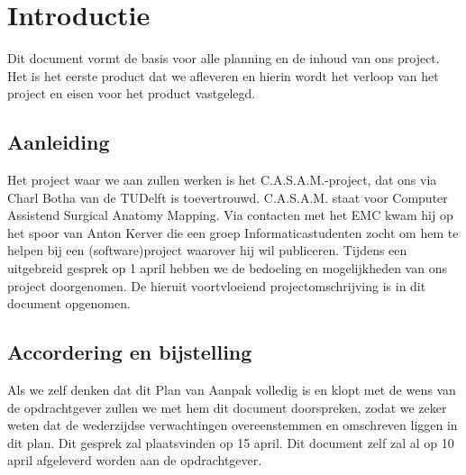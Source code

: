 \section{Introductie}

Dit document vormt de basis voor alle planning en de inhoud van ons project.
Het is het eerste product dat we afleveren en hierin wordt het verloop van het project en eisen voor het product vastgelegd.

\subsection{Aanleiding}

Het project waar we aan zullen werken is het C.A.S.A.M.-project, dat ons via Charl Botha van de TUDelft is toevertrouwd.
C.A.S.A.M. staat voor Computer Assistend Surgical Anatomy Mapping.
Via contacten met het EMC kwam hij op het spoor van Anton Kerver die een groep Informaticastudenten zocht om hem te helpen bij een (software)project waarover hij wil publiceren.
Tijdens een uitgebreid gesprek op 1 april hebben we de bedoeling en mogelijkheden van ons project doorgenomen.
De hieruit voortvloeiend projectomschrijving is in dit document opgenomen.

\subsection{Accordering en bijstelling}

Als we zelf denken dat dit Plan van Aanpak volledig is en klopt met de wens van de opdrachtgever zullen we met hem dit document doorspreken, zodat we zeker weten dat de wederzijdse verwachtingen overeenstemmen en omschreven liggen in dit plan.
Dit gesprek zal plaatsvinden op 15 april.
Dit document zelf zal al op 10 april afgeleverd worden aan de opdrachtgever.

